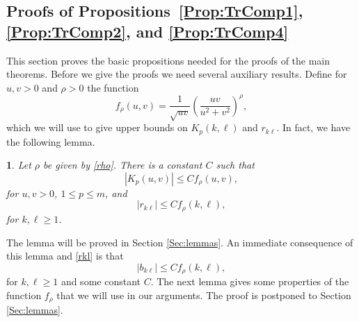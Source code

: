 \documentclass{article}
\numberwithin{equation}{section}
\numberwithin{figure}{section}
\theoremstyle{plain}
\theoremstyle{plain}
\newtheorem{lemma}[thm]{\protect\lemmaname}
\numberwithin{thm}{section}
\theoremstyle{remark}
\providecommand{\lemmaname}{Lemma}
\let \le \leqslant
\let \ge \geqslant
\begin{document}
\subsection{Proofs of Propositions~\ref{Prop:TrComp1}, \ref{Prop:TrComp2}, and \ref{Prop:TrComp4}}\label{Subsec:Basicprop}
This section proves the basic propositions needed for the proofs of the main theorems. Before we give the proofs we need several auxiliary results.
Define for $u,v>0$ and $\rho>0$ the function
\begin{equation}\label{frho}
f_\rho(u,v)=\frac 1{\sqrt{uv}}\left(\frac{uv}{u^2+v^2}\right)^\rho,
\end{equation}
which we will use to give upper bounds on $K_p(k,\ell)$ and $r_{k\ell}$. In fact, we have the following lemma.
\begin{lemma}\label{Lem:Kpbound}
Let $\rho$ be given by \eqref{rho}. There is a constant $C$ such that
\begin{equation}\label{Kpbound1}
|K_p(u,v)|\le Cf_\rho(u,v),
\end{equation}
for $u,v>0$, $1\le p\le m$, and
\begin{equation}\label{Kpbound2}
|r_{k\ell}|\le Cf_\rho(k,\ell),
\end{equation}
for $k,\ell\ge 1$.
\end{lemma}
The lemma will be proved in Section \ref{Sec:lemmas}. An immediate consequence of this lemma and \eqref{rkl} is that
\begin{equation}\label{bklest} 
|b_{k\ell}|\le Cf_\rho(k,\ell),
\end{equation}
for $k,\ell\ge 1$ and some constant $C$.
The next lemma gives some properties of the function $f_\rho$ that we will use in our arguments. The proof is postponed to Section \ref{Sec:lemmas}.
\end{document}
